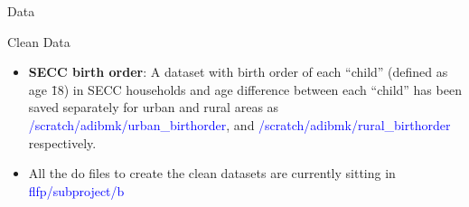\documentclass[aspectratio=169]{beamer}
\begin{document}
\begin{section}{Data}
\begin{frame}{Clean Data}
\begin{itemize}
     \item \textbf{SECC birth order}: A dataset with birth order of each
       “child” (defined as age \<\= 18) in SECC households and age
       difference between each “child” has been saved separately for
       urban and rural areas as \textcolor{blue}{/scratch/adibmk/urban\_birthorder}, and
       \textcolor{blue}{/scratch/adibmk/rural\_birthorder} respectively.
     \item All the do files to create the clean datasets are currently sitting in \textcolor{blue}{flfp/subproject/b}
     \end{itemize}
\end{frame}
\end{section}
\end{document}
